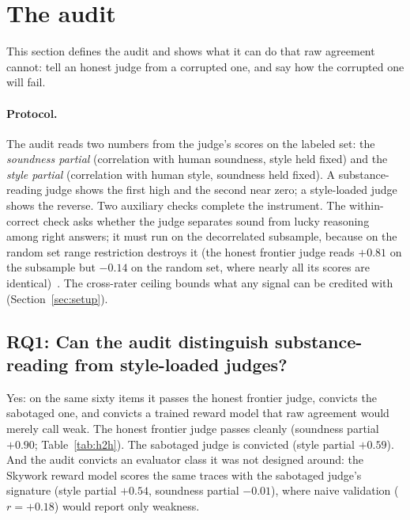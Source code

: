 \section{The audit}
\label{sec:audit}

This section defines the audit and shows what it can do that raw agreement cannot: tell an honest judge from a corrupted one, and say how the corrupted one will fail.

\paragraph{Protocol.}
The audit reads two numbers from the judge's scores on the labeled set: the \emph{soundness partial} (correlation with human soundness, style held fixed) and the \emph{style partial} (correlation with human style, soundness held fixed).
A substance-reading judge shows the first high and the second near zero; a style-loaded judge shows the reverse.
Two auxiliary checks complete the instrument.
The within-correct check asks whether the judge separates sound from lucky reasoning among right answers; it must run on the decorrelated subsample, because on the random set range restriction destroys it (the honest frontier judge reads $+0.81$ on the subsample but $-0.14$ on the random set, where nearly all its scores are identical)~\cite{companionB}.
The cross-rater ceiling bounds what any signal can be credited with (Section~\ref{sec:setup}).

\subsection*{RQ1: Can the audit distinguish substance-reading from style-loaded judges?}

Yes: on the same sixty items it passes the honest frontier judge, convicts the sabotaged one, and convicts a trained reward model that raw agreement would merely call weak.
The honest frontier judge passes cleanly (soundness partial $+0.90$; Table~\ref{tab:h2h}).
The sabotaged judge is convicted (style partial $+0.59$).
And the audit convicts an evaluator class it was not designed around: the Skywork reward model scores the same traces with the sabotaged judge's signature (style partial $+0.54$, soundness partial $-0.01$), where naive validation ($r = +0.18$) would report only weakness.

